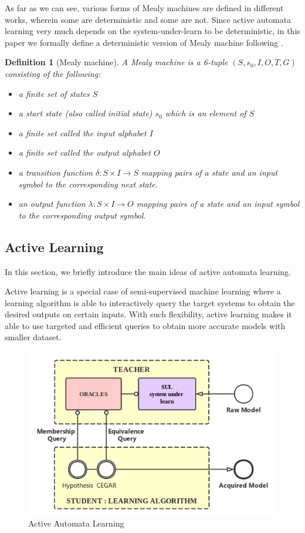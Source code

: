 \documentclass[conference, a4paper]{IEEEtran}
\newtheorem{definition}{Definition}
\begin{document}
As far as we can see, various forms of Mealy machines are defined in different works, wherein some
are deterministic and some are not. Since active automata learning very much depends on the
system-under-learn to be deterministic, in this paper we formally define a deterministic version of
Mealy machine following \cite{DBLP:conf/sfm/SteffenHM11}.

\begin{definition}[Mealy machine]
  A Mealy machine is a 6-tuple $(S, s_0, I, O, T, G)$ consisting of the following:
  \begin{itemize}
    \item[-] a finite set of states $S$
    \item[-] a start state (also called initial state) $s_0$ which is an element of $S$
    \item[-] a finite set called the input alphabet $I$
    \item[-] a finite set called the output alphabet $O$
    \item[-] a transition function $\delta : S \times I \rightarrow S$ mapping pairs of a
      state and an input symbol to the corresponding next state.
    \item[-] an output function $\lambda : S \times I \rightarrow O$ mapping pairs
      of a state and an input symbol to the corresponding output symbol.
  \end{itemize}
\end{definition}

\subsection{Active Learning}
In this section, we briefly introduce the main ideas of active automata learning. 

Active learning \cite{settles2010active} is a special case of semi-supervised machine learning where
a learning algorithm is able to interactively query the target systems to obtain the desired outputs
on certain inputs. With such flexibility, active learning makes it able to use targeted and efficient
queries to obtain more accurate models with smaller dataset. 


\begin{figure}[h]
  \begin{center}
    \includegraphics[width=.5\textwidth]{./images/activelearning.png}
  \end{center}
  \caption{Active Automata Learning}
  \label{fig:activelearning}
\end{figure}
\end{document}
